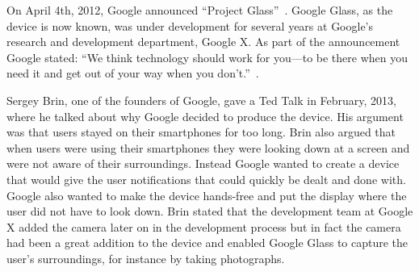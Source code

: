 %
%
%
%
%
%
%
%
On April 4th, 2012, Google announced ``Project Glass''~\cite{GoogleGlassConcept}. Google Glass, as the device is now known, was under development for several years at Google's research and development department, Google X. As part of the announcement Google stated:  ``We think technology should work for you---to be there when you need it and get out of your way when you don't.''~\cite{GoogleGlassAnnouncement}.

Sergey Brin, one of the founders of Google, gave a Ted Talk in February, 2013,~\cite{tedtalkWhyGlass} where he talked about why Google decided to produce the device. His argument was that users stayed on their smartphones for too long. Brin also argued that when users were using their smartphones they were looking down at a screen and were not aware of their surroundings. Instead Google wanted to create a device that would give the user notifications that could quickly be dealt and done with. Google also wanted to make the device hands-free and put the display where the user did not have to look down. Brin stated that the development team at Google X added the camera later on in the development process but in fact the camera had been a great addition to the device and enabled Google Glass to capture the user's surroundings, for instance by taking photographs.

